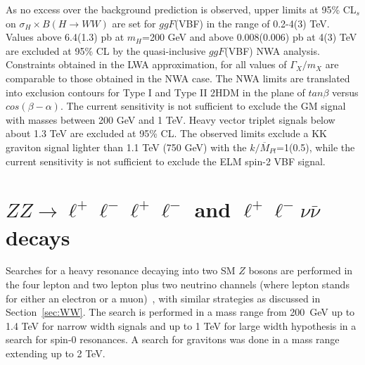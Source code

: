\documentclass{PoS}
\begin{document}
As no excess over the background prediction is observed, upper limits at 95\% CL$_s$ on $\sigma_H \times B(H\rightarrow WW)$ are set for $ggF$(VBF) in the range of 0.2-4(3) TeV. 
Values above 6.4(1.3) pb at $m_H$=200 GeV and above 0.008(0.006) pb at 4(3) TeV are excluded at 95\% CL by the quasi-inclusive $ggF$(VBF) NWA analysis.
Constraints obtained in the LWA approximation, for all values of $\Gamma_X/m_X$ are comparable to those obtained in the NWA case.
The NWA limits are translated into exclusion contours  for Type I and Type II 2HDM in the plane of $tan \beta$ versus $cos(\beta-\alpha)$.
The current sensitivity is not sufficient to exclude the GM signal with masses between 200 GeV and 1 TeV.
Heavy vector triplet signals below about 1.3 TeV are excluded at 95\% CL. 
The observed limits exclude a KK graviton signal lighter than 1.1 TeV (750 GeV) with the $k/\overline{M}_{Pl}$=1(0.5), while the current sensitivity is not sufficient to exclude the ELM spin-2 VBF signal. 

\vspace*{-3mm}
\section{$ZZ\rightarrow \ell^+\ell^-\ell^+\ell^-$ and $\ell^+\ell^-\nu\bar{\nu}$ decays} %
\label{sec:ZZ}
\vspace*{-2mm}
 Searches for a heavy resonance decaying into two SM $Z$ bosons are performed in the four lepton and two lepton plus two neutrino channels (where lepton stands for either an electron or a muon)~\cite{HIGG-2016-19}, with similar strategies as discussed in Section~\ref{sec:WW}. 
The search is performed in a mass range from 200~GeV up to 1.4 TeV for narrow width signals and up to 1 TeV for large width hypothesis in a search for spin-0 resonances. A search for gravitons was done in a mass range extending up to 2 TeV.
\end{document}
